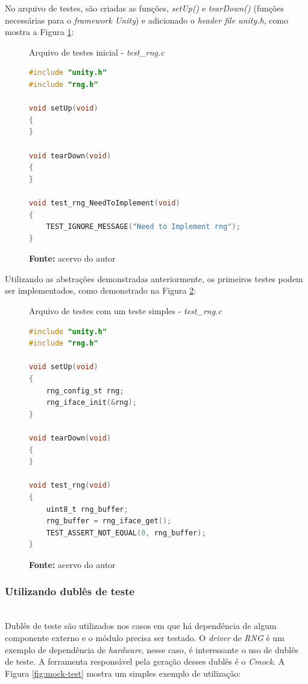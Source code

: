 \documentclass[times, twoside, watermark]{artigo}
\begin{document}
No arquivo de testes, são criadas as funções, \textit{setUp()} e
\textit{tearDown()} (funções necessárias para o \textit{framework Unity}) 
e adicionado o \textit{header file unity.h}, como 
mostra a Figura \ref{fig:tests-init}:\hfill\

\begin{figure}[H]
  \centering
  \caption{Arquivo de testes inicial - \textit{test\_rng.c}}
\begin{lstlisting}[language=C]
#include "unity.h"
#include "rng.h"

void setUp(void)
{
}

void tearDown(void)
{
}

void test_rng_NeedToImplement(void)
{
	TEST_IGNORE_MESSAGE("Need to Implement rng");
}
\end{lstlisting}
  \label{fig:tests-init}
  \caption*{\newline\textbf{Fonte:} acervo do autor}
\end{figure}

Utilizando as abstrações demonstradas anteriormente, os primeiros testes podem ser
implementados, como demonstrado na Figura \ref{fig:simple-test}:\hfill\\

\begin{figure}[H]
  \centering
  \caption{Arquivo de testes com um teste simples  - \textit{test\_rng.c}}
\begin{lstlisting}[language=C]
#include "unity.h"
#include "rng.h"

void setUp(void)
{
	rng_config_st rng;
	rng_iface_init(&rng);	
}

void tearDown(void)
{
}

void test_rng(void)
{	
	uint8_t rng_buffer;
	rng_buffer = rng_iface_get();
	TEST_ASSERT_NOT_EQUAL(0, rng_buffer);
}
\end{lstlisting}
  \label{fig:simple-test}
  \caption*{\newline\textbf{Fonte:} acervo do autor}
\end{figure}

\subsubsection{Utilizando dublês de teste}\hfill\\

Dublês de teste são utilizados nos casos em que há dependência de algum componente
externo e o módulo precisa ser testado. O \textit{driver} de \textit{RNG} é um
exemplo de dependência de \textit{hardware}, nesse caso, é interessante o uso
de dublês de teste. A ferramenta responsável pela geração desses dublês é o
\textit{Cmock}. A Figura \ref{fig:mock-test} mostra um simples exemplo de utilização:
\hfill\\
\end{document}
